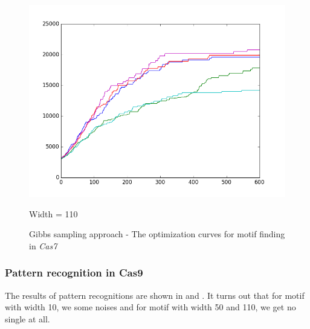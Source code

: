 \documentclass[11pt, oneside]{article}
\begin{document}
\begin{figure}[htbp]
\begin{minipage}{0.32\textwidth}
    \includegraphics[width=1\textwidth]{images/cas7_width110_curve} %
    \caption*{Width = 110}
  \end{minipage}
  \caption{Gibbs sampling approach - The optimization curves for motif finding in \textit{Cas7}}
  \label{fig:cas7}
\end{figure}

\subsubsection{Pattern recognition in Cas9}

The results of pattern recognitions are shown in  and . It turns out that for motif with width 10, we some noises and for motif with width 50 and 110, we get no single at all.
\end{document}
